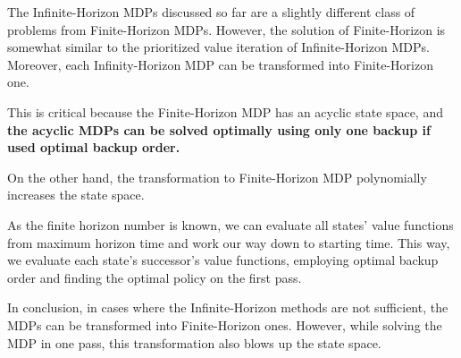 The Infinite-Horizon MDPs discussed so far are a slightly different class of problems from Finite-Horizon MDPs. However, the solution of Finite-Horizon is somewhat similar to the prioritized value iteration of Infinite-Horizon MDPs. 
Moreover, each Infinity-Horizon MDP can be transformed into Finite-Horizon one.

This is critical because the Finite-Horizon MDP has an acyclic state space, and \textbf{the acyclic MDPs can be solved optimally using only one backup if used optimal backup order.} \cite{Kolobov2012}

On the other hand, the transformation to Finite-Horizon MDP polynomially increases the state space.

As the finite horizon number is known, we can evaluate all states' value functions from maximum horizon time and work our way down to starting time. This way, we evaluate each state's successor's value functions, employing optimal backup order and finding the optimal policy on the first pass.

In conclusion, in cases where the Infinite-Horizon methods are not sufficient, the MDPs can be transformed into Finite-Horizon ones. However, while solving the MDP in one pass, this transformation also blows up the state space.

